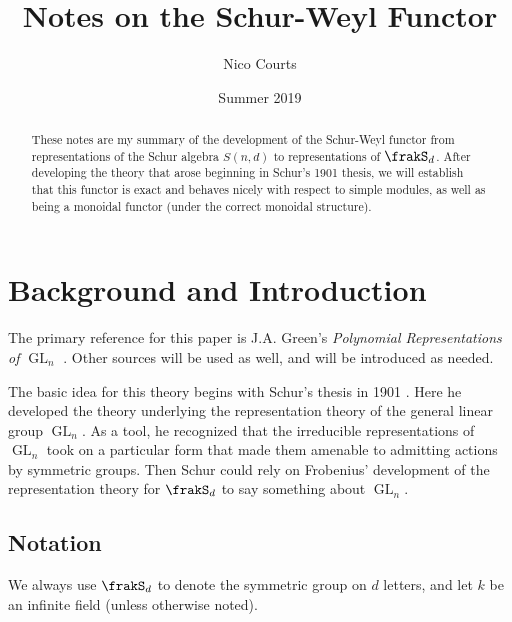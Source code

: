 \documentclass[12pt]{article}
\DeclareMathOperator{\1}{\mathbbm{1}}
\DeclareMathOperator{\GL}{GL}
\begin{document}
\title{Notes on the Schur-Weyl Functor \vspace{-1ex}}
\author{Nico Courts}
\date{Summer 2019}
\maketitle

\begin{abstract}
	These notes are my summary of the development of the Schur-Weyl functor from representations of the Schur algebra $S(n,d)$ to 
	representations of $\frakS_d$. After developing the theory that arose beginning in Schur's 1901 thesis, we will establish that this 
	functor is exact and behaves nicely with respect to simple modules, as well as being a monoidal functor (under the correct monoidal structure).
\end{abstract}

\section{Background and Introduction}
The primary reference for this paper is J.A. Green's \textit{Polynomial Representations of $\GL_n$} \cite{green}. Other sources will be used as well, 
and will be introduced as needed.

The basic idea for this theory begins with Schur's thesis in 1901 \cite{schur-thesis}. Here he developed the theory underlying
the representation theory of the general linear group $\GL_n$. As a tool, he recognized that the irreducible representations of 
$\GL_n$ took on a particular form that made them amenable to admitting actions by symmetric groups. Then Schur could rely on 
Frobenius' development of the representation theory for $\frakS_d$ to say something about $\GL_n$.

\subsection{Notation}
We always use $\frakS_d$ to denote the symmetric group on $d$ letters, and let $k$ be an infinite field (unless otherwise noted).
\end{document}
